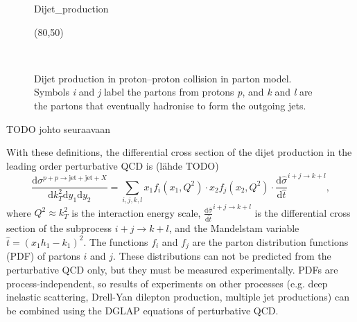 \documentclass[a4paper, twoside, english, 12pt]{article}
\begin{document}
\begin{figure}[t]
	\centering
	\begin{fmffile}{Dijet_production}
		\begin{fmfchar*}(80,50)
			\fmffreeze
		\end{fmfchar*}
	\end{fmffile}\\[1em]
	\caption{Dijet production in proton--proton collision in parton model. Symbols \textit{i} and \textit{j} label the partons from protons \textit{p}, and \textit{k} and \textit{l} are the partons that eventually hadronise to form the outgoing jets.}
	\label{F:dijet_production}
\end{figure}


TODO johto seuraavaan

With these definitions, the differential cross section of the dijet production in the leading order perturbative QCD is (lähde TODO)
\begin{equation}\label{E:dijet_cross_section}
\frac{\text{d}\sigma^{p+p\rightarrow\text{jet}+\text{jet}+X}}{\text{d}k_T^2\text{d}y_1\text{d}y_2} = \sum_{i,j,k,l} x_1f_i(x_1,Q^2)\cdot x_2f_j(x_2,Q^2) \cdot\frac{\text{d}\hat{\sigma}}{\text{d}\hat{t}}^{i+j\rightarrow k+l},
\end{equation}
where $Q^2\approx k_T^2$ is the interaction energy scale, $\frac{\text{d}\hat{\sigma}}{\text{d}\hat{t}}^{i+j\rightarrow k+l}$ is the differential cross section of the subprocess $i+j\rightarrow k+l$, and the Mandelstam variable $\hat{t} = (x_1h_1-k_1)^2$. The functions $f_i$ and $f_j$ are the parton distribution functions (PDF) of partons $i$ and $j$. These distributions can not be predicted from the perturbative QCD only, but they must be measured experimentally. PDFs are process-independent, so results of experiments on other processes (e.g. deep inelastic scattering, Drell-Yan dilepton production, multiple jet productions) can be combined using the DGLAP equations of perturbative QCD.
\end{document}
